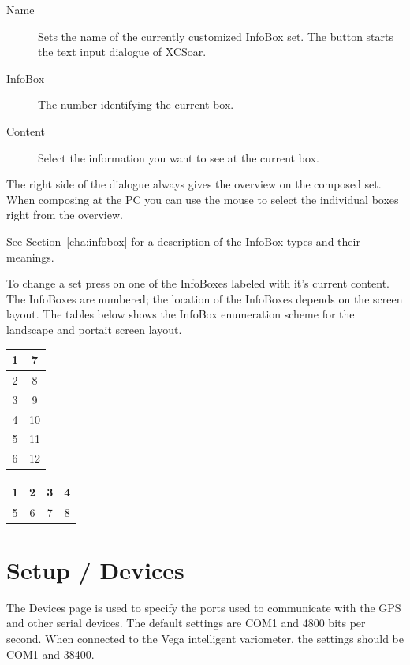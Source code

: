 \begin{description}
\item[Name]  Sets the name of the currently customized InfoBox set. The 
  button starts the text input dialogue of XCSoar.
\item[InfoBox]  The number identifying the current box.
\item[Content]  Select the information you want to see at the current box.
\end{description}

The right side of the dialogue always gives the overview on the composed set. 
When composing at the PC you can use the mouse to select the individual boxes 
right from the overview.

See Section~\ref{cha:infobox} for a description of the InfoBox types and their meanings.

To change a set press on one of the InfoBoxes labeled with it's current content.
The InfoBoxes are numbered; the location of the InfoBoxes depends on the screen layout.  
The tables below shows the InfoBox enumeration scheme for the 
landscape and portait screen layout.

\begin{multicols}{2}
\begin{tabular}{|c|c|}
\hline
1 & 7 \\
\hline
2 & 8 \\
\hline
3 & 9 \\
\hline
4 & 10 \\
\hline
5 & 11 \\
\hline
6 & 12 \\
\hline
\end{tabular}

\begin{tabular}{|c|c|c|c|}
\hline
1 & 2 & 3 & 4 \\
\hline
\hline
5 & 6 & 7 & 8 \\
\hline
\end{tabular}
\end{multicols}

\section{Setup / Devices} \label{conf:comdevices}

The Devices page is used to specify the ports used to communicate with
the GPS and other serial devices. The default settings are COM1 and
4800 bits per second.  When connected to the Vega intelligent
variometer, the settings should be COM1 and 38400.

